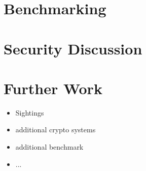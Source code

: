 \documentclass{eplmastersthesis}
\begin{document}
\section{Benchmarking}

\section{Security Discussion}

\section{Further Work}
\begin{itemize}
\item Sightings
\item additional crypto systems
\item additional benchmark
\item ...
\end{itemize}


\newpage


\newpage

\backcoverpage
\end{document}
